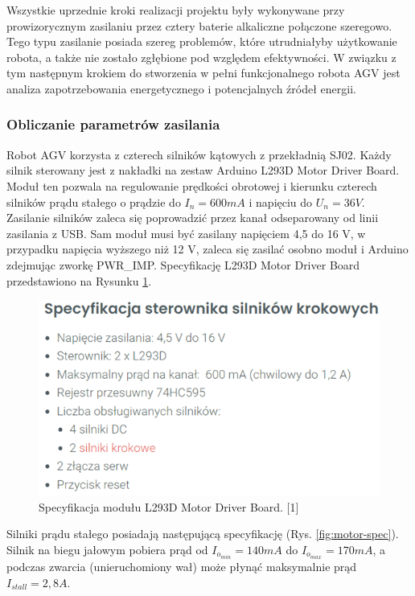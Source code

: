 \documentclass{report}
\begin{document}
Wszystkie uprzednie kroki realizacji projektu były wykonywane przy prowizorycznym zasilaniu przez cztery baterie alkaliczne połączone szeregowo. Tego typu zasilanie posiada szereg problemów, które utrudniałyby użytkowanie robota, a także nie zostało zgłębione pod względem efektywności. W związku z tym następnym krokiem do stworzenia w pełni funkcjonalnego robota AGV jest analiza zapotrzebowania energetycznego i potencjalnych źródeł energii.

\subsubsection{\large Obliczanie parametrów zasilania}

Robot AGV korzysta z czterech silników kątowych z przekładnią SJ02. Każdy silnik sterowany jest z nakładki na zestaw Arduino L293D Motor Driver Board. Moduł ten pozwala na regulowanie prędkości obrotowej i kierunku czterech silników prądu stałego o prądzie do $I_n=600 mA$ i napięciu do $U_n=36 V$. Zasilanie silników zaleca się poprowadzić przez kanał odseparowany od linii zasilania z USB. Sam moduł musi być zasilany napięciem 4,5 do 16 V, w przypadku napięcia wyższego niż 12 V, zaleca się zasilać osobno moduł i Arduino zdejmując zworkę PWR\_IMP. Specyfikację L293D Motor Driver Board przedstawiono na Rysunku \ref{fig:motor-driver-spec}.

\begin{figure}[H]
    \centering
    \includegraphics{src/tech_specifications/L293D Motor Driver Board.png}
    \caption{Specyfikacja modułu L293D Motor Driver Board. [1]}
    \label{fig:motor-driver-spec}
\end{figure}

Silniki prądu stałego posiadają następującą specyfikację (Rys. \ref{fig:motor-spec}). Silnik na biegu jałowym 
pobiera prąd od $I_{o_{min}}=140 mA$ do $I_{o_{max}}=170 mA$, a podczas zwarcia (unieruchomiony wał) może płynąć maksymalnie prąd $I_{stall}=2,8 A$.
\end{document}
